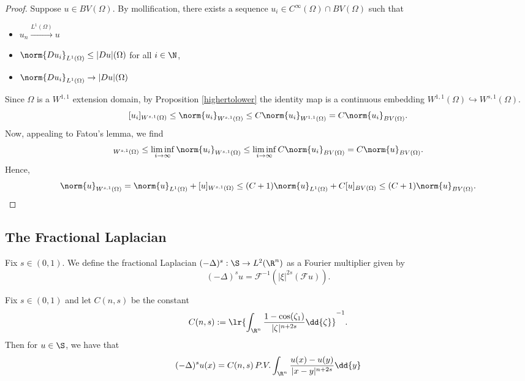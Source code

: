 \documentclass[../main.tex]{subfiles}
\begin{document}
\begin{proof}
    Suppose $ u\in BV(\Omega) $. By mollification, there exists a sequence $ u_{i}\in C^{\infty}(\Omega)\cap BV(\Omega) $ such that 
    \begin{itemize}
        \item $ u_{n}\xrightarrow{L^{1}(\Omega)}u $
        \item $ \norm{Du_{i}}_{L^{1}(\Omega)}  \leq |Du|(\Omega) $ for all $ i\in \N $,
        \item $ \norm{Du_{i}}_{L^{1}(\Omega)}\to |Du|(\Omega) $
    \end{itemize}
    Since $ \Omega $ is a $ W^{1,1} $ extension domain, by Proposition \ref{highertolower} the identity map is a continuous embedding $W^{1,1}(\Omega)\hookrightarrow W^{s,1}(\Omega) $.
    \[
        [u_{i}]_{W^{s,1}(\Omega)} \leq \norm{u_{i}}_{W^{s,1}(\Omega)} \leq C\norm{u_{i}}_{W^{1,1}(\Omega)} = C\norm{u_{i}}_{BV(\Omega)}.
    \]
    Now, appealing to Fatou's lemma, we find
    \begin{align*}
        [u]_{W^{s,1}(\Omega)} \leq \liminf_{i\to\infty} \norm{u_{i}}_{W^{s,1}(\Omega)} \leq \liminf_{i\to\infty} C \norm{u_{i}}_{BV(\Omega)} = C \norm{u}_{BV(\Omega)}.
    \end{align*}
    Hence, 
    \[
        \norm{u}_{W^{s,1}(\Omega)} = \norm{u}_{L^{1}(\Omega)}+ [u]_{W^{s,1}(\Omega)} \leq (C+1)\norm{u}_{L^{1}(\Omega)} +  C[u]_{BV(\Omega)} \leq (C+1)\norm{u}_{BV(\Omega)}.
    \]
\end{proof}


\subsection{The Fractional Laplacian}

\begin{definition}
    Fix $ s\in (0,1) $. We define the fractional Laplacian $ (-\Delta)^{s}:\S\to L^{2}(\R^{n}) $ as a Fourier multiplier given by
    \[
        (-\Delta)^{s}u = \mathscr{F}^{-1} (| \xi|^{2s}( \mathscr{F}u)).
    \]
\end{definition}

\begin{proposition}\label{laplacianisintegral}
    Fix $ s\in (0,1) $ and let $ C(n,s) $ be the constant 
    \begin{equation}
        C(n,s) := \lr{ \int_{\R^{n}}\frac{1-\cos(\zeta_{1})}{| \zeta|^{n+2s}}\dd{\zeta}  }^{-1}.
    \end{equation}
    Then for $ u\in \S $, we have that 
    \begin{equation}
        (-\Delta )^{s}u(x) = C(n,s)\, P.V. \int_{\R^{n}} \frac{u(x) - u(y)}{|x-y|^{n+2s}} \dd{y}
    \end{equation}
\end{proposition}
\end{document}
